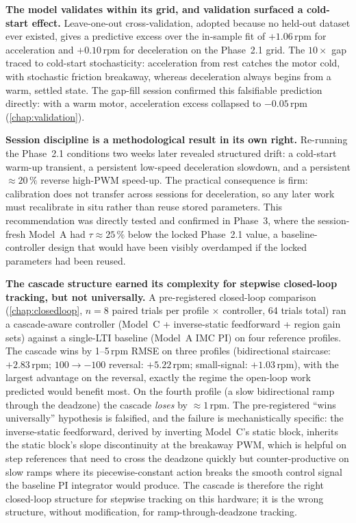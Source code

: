 \textbf{The model validates within its grid, and validation surfaced a cold-start effect.} Leave-one-out cross-validation, adopted because no held-out dataset ever existed, gives a predictive excess over the in-sample fit of $+1.06$\,rpm for acceleration and $+0.10$\,rpm for deceleration on the Phase~2.1 grid. The $10\times$ gap traced to cold-start stochasticity: acceleration from rest catches the motor cold, with stochastic friction breakaway, whereas deceleration always begins from a warm, settled state. The gap-fill session confirmed this falsifiable prediction directly: with a warm motor, acceleration excess collapsed to $-0.05$\,rpm (\cref{chap:validation}).

\textbf{Session discipline is a methodological result in its own right.} Re-running the Phase~2.1 conditions two weeks later revealed structured drift: a cold-start warm-up transient, a persistent low-speed deceleration slowdown, and a persistent ${\approx}20\,\%$ reverse high-PWM speed-up. The practical consequence is firm: calibration does not transfer across sessions for deceleration, so any later work must recalibrate in situ rather than reuse stored parameters. This recommendation was directly tested and confirmed in Phase~3, where the session-fresh Model~A had $\tau \approx 25\,\%$ below the locked Phase~2.1 value, a baseline-controller design that would have been visibly overdamped if the locked parameters had been reused.

\textbf{The cascade structure earned its complexity for stepwise closed-loop tracking, but not universally.} A pre-registered closed-loop comparison (\cref{chap:closedloop}, $n=8$ paired trials per profile $\times$ controller, 64 trials total) ran a cascade-aware controller (Model~C + inverse-static feedforward + region gain sets) against a single-LTI baseline (Model~A IMC PI) on four reference profiles. The cascade wins by 1--5\,rpm RMSE on three profiles (bidirectional staircase: $+2.83$\,rpm; $100\to-100$ reversal: $+5.22$\,rpm; small-signal: $+1.03$\,rpm), with the largest advantage on the reversal, exactly the regime the open-loop work predicted would benefit most. On the fourth profile (a slow bidirectional ramp through the deadzone) the cascade \emph{loses} by ${\approx}1$\,rpm. The pre-registered ``wins universally'' hypothesis is falsified, and the failure is mechanistically specific: the inverse-static feedforward, derived by inverting Model~C's static block, inherits the static block's slope discontinuity at the breakaway PWM, which is helpful on step references that need to cross the deadzone quickly but counter-productive on slow ramps where its piecewise-constant action breaks the smooth control signal the baseline PI integrator would produce. The cascade is therefore the right closed-loop structure for stepwise tracking on this hardware; it is the wrong structure, without modification, for ramp-through-deadzone tracking.

